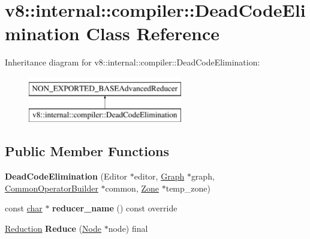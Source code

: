 \hypertarget{classv8_1_1internal_1_1compiler_1_1DeadCodeElimination}{}\section{v8\+:\+:internal\+:\+:compiler\+:\+:Dead\+Code\+Elimination Class Reference}
\label{classv8_1_1internal_1_1compiler_1_1DeadCodeElimination}
Inheritance diagram for v8\+:\+:internal\+:\+:compiler\+:\+:Dead\+Code\+Elimination\+:\begin{figure}[H]
\begin{center}
\leavevmode
\includegraphics[height=2.000000cm]{classv8_1_1internal_1_1compiler_1_1DeadCodeElimination}
\end{center}
\end{figure}
\subsection*{Public Member Functions}
\begin{DoxyCompactItemize}
\item 
\mbox{\label{classv8_1_1internal_1_1compiler_1_1DeadCodeElimination_aa786b4663af81c5ff375c5f4f01542ac}} 
{\bfseries Dead\+Code\+Elimination} (Editor $\ast$editor, \mbox{\hyperlink{classv8_1_1internal_1_1compiler_1_1Graph}{Graph}} $\ast$graph, \mbox{\hyperlink{classv8_1_1internal_1_1compiler_1_1CommonOperatorBuilder}{Common\+Operator\+Builder}} $\ast$common, \mbox{\hyperlink{classv8_1_1internal_1_1Zone}{Zone}} $\ast$temp\+\_\+zone)
\item 
\mbox{\label{classv8_1_1internal_1_1compiler_1_1DeadCodeElimination_a65e24d993b9a4a08caa724162a0a7f1f}} 
const \mbox{\hyperlink{classchar}{char}} $\ast$ {\bfseries reducer\+\_\+name} () const override
\item 
\mbox{\label{classv8_1_1internal_1_1compiler_1_1DeadCodeElimination_ad618e11ccaa5186dfc88dc0aa8fedc7a}} 
\mbox{\hyperlink{classv8_1_1internal_1_1compiler_1_1Reduction}{Reduction}} {\bfseries Reduce} (\mbox{\hyperlink{classv8_1_1internal_1_1compiler_1_1Node}{Node}} $\ast$node) final
\end{DoxyCompactItemize}


